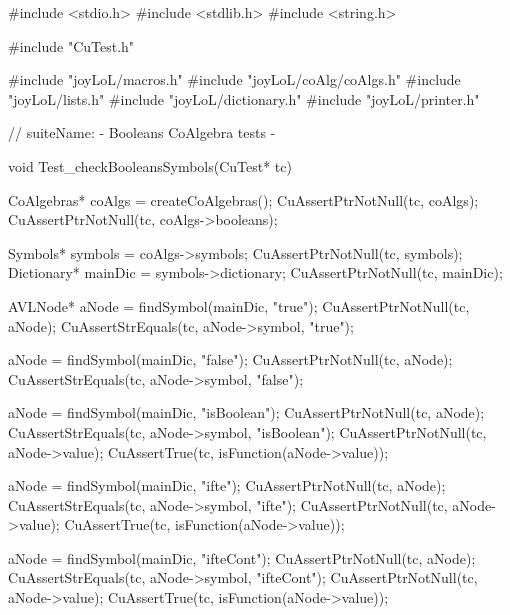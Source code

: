 
\starttyping
#include <stdio.h>
#include <stdlib.h>
#include <string.h>

#include "CuTest.h"

#include "joyLoL/macros.h"
#include "joyLoL/coAlg/coAlgs.h"
#include "joyLoL/lists.h"
#include "joyLoL/dictionary.h"
#include "joyLoL/printer.h"

// suiteName: - Booleans CoAlgebra tests -

void Test_checkBooleansSymbols(CuTest* tc) {
  CoAlgebras* coAlgs = createCoAlgebras();
  CuAssertPtrNotNull(tc, coAlgs);
  CuAssertPtrNotNull(tc, coAlgs->booleans);

  Symbols* symbols = coAlgs->symbols;
  CuAssertPtrNotNull(tc, symbols);
  Dictionary* mainDic = symbols->dictionary;
  CuAssertPtrNotNull(tc, mainDic);

  AVLNode* aNode = findSymbol(mainDic, "true");
  CuAssertPtrNotNull(tc, aNode);
  CuAssertStrEquals(tc, aNode->symbol, "true");

  aNode = findSymbol(mainDic, "false");
  CuAssertPtrNotNull(tc, aNode);
  CuAssertStrEquals(tc, aNode->symbol, "false");

  aNode = findSymbol(mainDic, "isBoolean");
  CuAssertPtrNotNull(tc, aNode);
  CuAssertStrEquals(tc, aNode->symbol, "isBoolean");
  CuAssertPtrNotNull(tc, aNode->value);
  CuAssertTrue(tc, isFunction(aNode->value));

  aNode = findSymbol(mainDic, "ifte");
  CuAssertPtrNotNull(tc, aNode);
  CuAssertStrEquals(tc, aNode->symbol, "ifte");
  CuAssertPtrNotNull(tc, aNode->value);
  CuAssertTrue(tc, isFunction(aNode->value));

  aNode = findSymbol(mainDic, "ifteCont");
  CuAssertPtrNotNull(tc, aNode);
  CuAssertStrEquals(tc, aNode->symbol, "ifteCont");
  CuAssertPtrNotNull(tc, aNode->value);
  CuAssertTrue(tc, isFunction(aNode->value));
}

\stoptyping

\stopJoyLoLWord